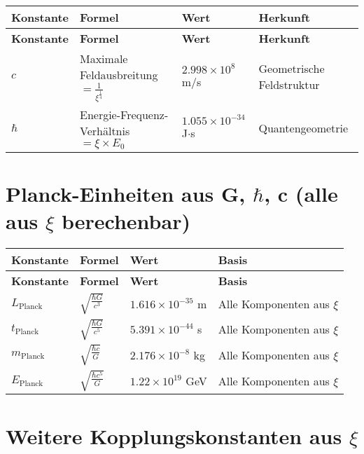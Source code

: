 \documentclass[12pt,a4paper]{article}
\begin{document}
	\begin{longtable}{|p{3cm}|p{5cm}|p{4cm}|p{3cm}|}
		\hline
		\textbf{Konstante} & \textbf{Formel} & \textbf{Wert} & \textbf{Herkunft} \\
		\hline
		\endfirsthead
		\hline
		\textbf{Konstante} & \textbf{Formel} & \textbf{Wert} & \textbf{Herkunft} \\
		\hline
		\endhead
		\(c\) & Maximale Feldausbreitung \(= \frac{1}{\xi^{\frac{1}{4}}}\) & \(2.998 \times 10^{8}\) m/s & Geometrische Feldstruktur \\
		\hline
		\(\hbar\) & Energie-Frequenz-Verhältnis \(= \xi \times E_0\) & \(1.055 \times 10^{-34}\) J\(\cdot\)s & Quantengeometrie \\
		\hline
	\end{longtable}
	
	\section{Planck-Einheiten aus G, \(\hbar\), c (alle aus \(\xi\) berechenbar)}
	
	\begin{longtable}{|p{3cm}|p{4cm}|p{4cm}|p{3cm}|}
		\hline
		\textbf{Konstante} & \textbf{Formel} & \textbf{Wert} & \textbf{Basis} \\
		\hline
		\endfirsthead
		\hline
		\textbf{Konstante} & \textbf{Formel} & \textbf{Wert} & \textbf{Basis} \\
		\hline
		\endhead
		\(L_{\text{Planck}}\) & \(\sqrt{\frac{\hbar G}{c^{3}}}\) & \(1.616 \times 10^{-35}\) m & Alle Komponenten aus \(\xi\) \\
		\hline
		\(t_{\text{Planck}}\) & \(\sqrt{\frac{\hbar G}{c^{5}}}\) & \(5.391 \times 10^{-44}\) s & Alle Komponenten aus \(\xi\) \\
		\hline
		\(m_{\text{Planck}}\) & \(\sqrt{\frac{\hbar c}{G}}\) & \(2.176 \times 10^{-8}\) kg & Alle Komponenten aus \(\xi\) \\
		\hline
		\(E_{\text{Planck}}\) & \(\sqrt{\frac{\hbar c^{5}}{G}}\) & \(1.22 \times 10^{19}\) GeV & Alle Komponenten aus \(\xi\) \\
		\hline
	\end{longtable}
	
	\section{Weitere Kopplungskonstanten aus \(\xi\)}
	
\end{document}
